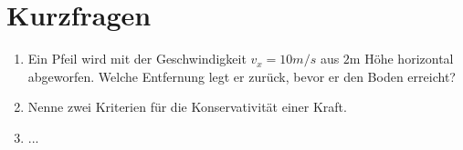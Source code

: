 \section{Kurzfragen}
\begin{enumerate}
  \item Ein Pfeil wird mit der Geschwindigkeit $v_x = 10 m/s$ aus $2\si{\meter}$ Höhe horizontal abgeworfen. Welche
  Entfernung legt er zurück, bevor er den Boden erreicht?
  \item Nenne zwei Kriterien für die Konservativität einer Kraft.
  \item ...
\end{enumerate}

\newpage
